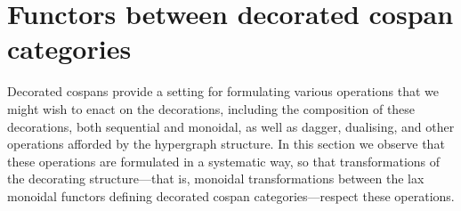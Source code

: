 \section{Functors between decorated cospan categories} \label{sec:dcf}

Decorated cospans provide a setting for formulating various operations that we
might wish to enact on the decorations, including the composition of these
decorations, both sequential and monoidal, as well as dagger, dualising, and
other operations afforded by the hypergraph structure. In this section we
observe that these operations are formulated in a systematic way, so that
transformations of the decorating structure---that is, monoidal transformations
between the lax monoidal functors defining decorated cospan categories---respect
these operations. 

